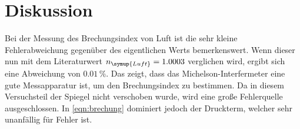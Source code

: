 \section{Diskussion}
\label{sec:Diskussion}



Bei der Messung des Brechungsindex  von Luft ist die sehr kleine Fehlerabweichung gegenüber des eigentlichen Werts bemerkenswert. Wenn dieser nun 
mit dem Literaturwert $n_{\symup{Luft}} = 1.0003$ \cite{brechung} verglichen wird, ergibt sich eine Abweichung von $0.01\,\%$. Das zeigt, dass das Michelson-Interfermeter 
eine gute Messapparatur ist, um den Brechungsindex zu bestimmen. Da in diesem Versuchsteil der Spiegel nicht verschoben wurde, wird eine große Fehlerquelle 
ausgeschlossen. In \autoref{eqn:brechung} dominiert jedoch der Druckterm, welcher sehr unanfällig für Fehler ist.